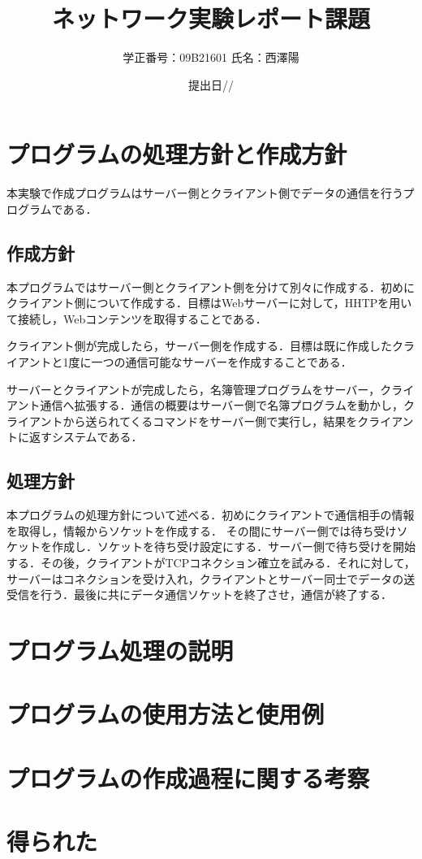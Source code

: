 \documentclass[11pt,a4j,titlepage]{jsarticle}
\begin{document}
\title{ネットワーク実験レポート課題}
\author{学正番号：09B21601 氏名：西澤陽}
\date{提出日//}
\maketitle
\section{プログラムの処理方針と作成方針}
本実験で作成プログラムはサーバー側とクライアント側でデータの通信を行うプログラムである．
\subsection{作成方針}
本プログラムではサーバー側とクライアント側を分けて別々に作成する．初めにクライアント側について作成する．目標はWebサーバーに対して，HHTPを用いて接続し，Webコンテンツを取得することである．

クライアント側が完成したら，サーバー側を作成する．目標は既に作成したクライアントと1度に一つの通信可能なサーバーを作成することである．

サーバーとクライアントが完成したら，名簿管理プログラムをサーバー，クライアント通信へ拡張する．通信の概要はサーバー側で名簿プログラムを動かし，クライアントから送られてくるコマンドをサーバー側で実行し，結果をクライアントに返すシステムである．
\subsection{処理方針}
本プログラムの処理方針について述べる．初めにクライアントで通信相手の情報を取得し，情報からソケットを作成する．
その間にサーバー側では待ち受けソケットを作成し．ソケットを待ち受け設定にする．サーバー側で待ち受けを開始する．その後，クライアントがTCPコネクション確立を試みる．それに対して，サーバーはコネクションを受け入れ，クライアントとサーバー同士でデータの送受信を行う．最後に共にデータ通信ソケットを終了させ，通信が終了する．

\section{プログラム処理の説明}
\section{プログラムの使用方法と使用例}
\section{プログラムの作成過程に関する考察}
\section{得られた}
\end{document}
